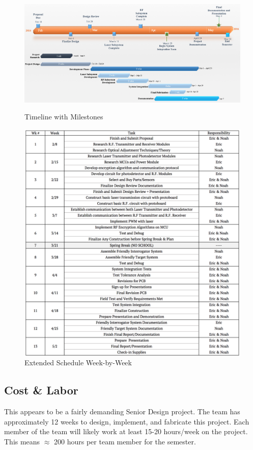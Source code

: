 \documentclass[openbib,letterpaper,10pt]{article}
\begin{document}
\begin{spacing}{1.15}
\begin{figure} [H]
	\centering
	\includegraphics[scale=0.5]{Timeline.png}
	\label{fig:timeline}
	\caption{Timeline with Milestones\label{fig:timeline}}
\end{figure}

\begin{figure} [H]
	\centering
	\includegraphics[scale=0.65]{Schedule_Extended.png}
	\caption{Extended Schedule Week-by-Week\label{fig:schedule}}
\end{figure}


\subsection{Cost \& Labor}
This appears to be a fairly demanding Senior Design project. The team has approximately 12 weeks to design, implement, and fabricate this project. Each member of the team will likely work at least 15-20 hours/week on the project. This means $\approx$ 200 hours per team member for the semester. 


\end{spacing}
\end{document}
